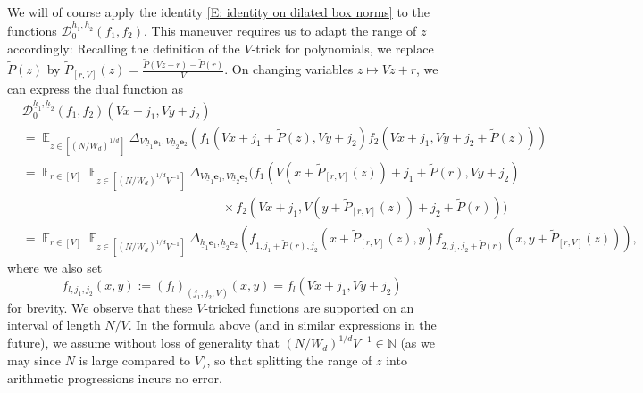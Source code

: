 \documentclass[11pt]{amsart}
\theoremstyle{definition}
\DeclareMathOperator*{\E}{\mathbb{E}}
\newcommand{\N}{{\mathbb N}}
\newcommand{\be}{{\mathbf{e}}}
\newcommand{\uh}{{\underline{h}}}
\begin{document}
We will of course apply the identity \eqref{E: identity on dilated box norms} to the functions $\mathcal{D}^{\uh_1,\uh_2}_0(f_1,f_2)$.
This maneuver requires us to adapt the range of $z$ accordingly: Recalling the definition of the $V$-trick for polynomials, we replace $\widetilde{P}(z)$ by $\widetilde{P}_{[r, V]}(z) = \frac{\widetilde P(Vz + r)-\widetilde P(r)}{V}$. 
On changing variables 
$z \mapsto Vz+r$, we can express the dual function as 
\begin{align*}
        &\mathcal{D}_0^{\uh_1,\uh_2}(f_1,f_2)(Vx+j_1,Vy+j_2)\\
    &=\E_{z \in [(N/W_d)^{1/d}]} \Delta_{V\uh_1 \be_1,V\uh_2 \be_2}(f_1(Vx+j_1 + \widetilde P(z),Vy+j_2)f_2(Vx+j_1,Vy+j_2+\widetilde P(z)))\\
 &=\E_{r \in [V]} \E_{z \in [(N/W_d)^{1/d}V^{-1}]} \Delta_{V\uh_1 \be_1,V\uh_2 \be_2} (f_1(V(x+\widetilde P_{[r, V]}(z))+j_1+\widetilde P(r),Vy+j_2) \\
  &\qquad\qquad\qquad\qquad\qquad\qquad\qquad\qquad\times f_2(Vx+j_1,V(y+\widetilde P_{[r, V]}(z))+j_2+\widetilde P(r)))\\
  &=\E_{r \in [V]} \E_{z \in [(N/W_d)^{1/d}V^{-1}]} \Delta_{\uh_1 \be_1,\uh_2 \be_2} (f_{1,j_1+\widetilde P(r),j_2}(x+\widetilde P_{[r, V]}(z),y) f_{2,j_1, j_2+\widetilde P(r)}(x,y+\widetilde{P}_{[r, V]}(z))),
\end{align*}
where we also set $$f_{l, j_1, j_2}(x,y) := (f_l)_{(j_1, j_2, V)}(x,y) = f_l(Vx + j_1, Vy + j_2)$$ for brevity.  We observe that these $V$-tricked functions are supported on an interval of length $N/V$. {In the formula above (and in similar expressions in the future), we assume without loss of generality that $(N/W_d)^{1/d}V^{-1}\in\N$ (as we may since $N$ is large compared to $V$), so that splitting the range of $z$ into arithmetic progressions incurs no error.} 
\end{document}
